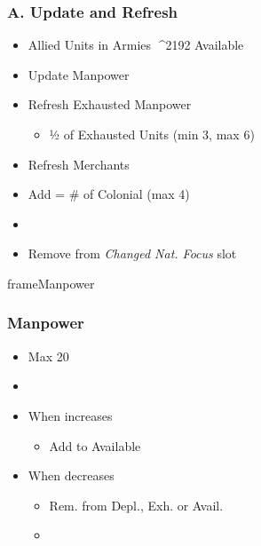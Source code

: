 \documentclass[10pt]{article}
\begin{document}
\subsubsection*{A. Update and Refresh}
\begin{itemize}
	\item Allied Units in Armies ^^^^2192 Available \manpower
	\item {}Update Manpower
	\item Refresh Exhausted Manpower
	\begin{itemize}
		\item ½ of Exhausted Units (min 3, max 6)
	\end{itemize}
	\item Refresh Merchants
	\item Add \colonists = \# of Colonial \claims (max 4)
	\item {}
	\item Remove \cube from \emph{Changed Nat. Focus} slot
\end{itemize}
\begin{dynamiccontents*}{frameManpower}
	\subsubsection*{Manpower }
	\begin{itemize}
		\item Max 20
		\item {}
		\item When increases
		\begin{itemize}
			\item Add to Available \manpower
		\end{itemize}
		\item When decreases
		\begin{itemize}
			\item Rem. from Depl., Exh. or Avail. \manpower
			\item {}
		\end{itemize}
	\end{itemize}
\end{dynamiccontents*}
\end{document}
